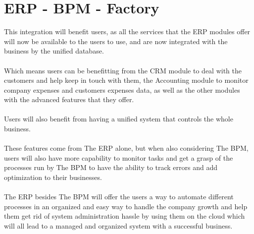 \chapter{ERP - BPM - Factory}
This integration will benefit users, as all the services that the ERP modules offer will now be available
to the users to use, and are now integrated with the business by the unified database.\\\\
Which means users can be benefitting from the CRM module to deal with the customers and help
keep in touch with them, the Accounting module to monitor company expenses and customers
expenses data, as well as the other modules with the advanced features that they offer.\\\\
Users will also benefit from having a unified system that controls the whole business.\\\\
These features come from The ERP alone, but when also considering The BPM, users will also have
more capability to monitor tasks and get a grasp of the processes run by The BPM to have the ability
to track errors and add optimization to their businesses.\\\\
The ERP besides The BPM will offer the users a way to automate different processes in an organized
and easy way to handle the company growth and help them get rid of system administration hassle by
using them on the cloud which will all lead to a managed and organized system with a successful
business.
